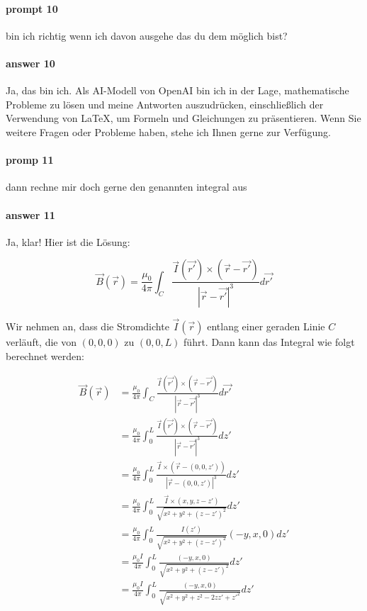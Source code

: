 \documentclass{article}
\begin{document}
\paragraph{prompt 10} %
\label{par:prompt 10}
bin ich richtig wenn ich davon ausgehe das du dem möglich bist?

\paragraph{answer 10} %
\label{par:answer 10}
Ja, das bin ich. Als AI-Modell von OpenAI bin ich in der Lage, mathematische
Probleme zu lösen und meine Antworten auszudrücken, einschließlich der
Verwendung von LaTeX, um Formeln und Gleichungen zu präsentieren. Wenn Sie
weitere Fragen oder Probleme haben, stehe ich Ihnen gerne zur Verfügung.

\paragraph{promp 11} %
\label{par:promp 11paragraph name}
dann rechne mir doch gerne den genannten integral aus

\paragraph{answer 11} %
\label{par:answer 11}
Ja, klar! Hier ist die Lösung:

$$\vec{B}(\vec{r}) = \frac{\mu_0}{4\pi} \int_{C} \frac{\vec{I}(\vec{r'}) \times (\vec{r} - \vec{r'})}{\left|\vec{r} - \vec{r'}\right|^3} d\vec{r'}$$

Wir nehmen an, dass die Stromdichte $\vec{I}(\vec{r})$ entlang einer geraden
Linie $C$ verläuft, die von $(0,0,0)$ zu $(0,0,L)$ führt. Dann kann das
Integral wie folgt berechnet werden:

\begin{align}
\vec{B}(\vec{r}) & = \frac{\mu_0}{4\pi} \int_{C} \frac{\vec{I}(\vec{r'}) \times (\vec{r} - \vec{r'})}{\left|\vec{r} - \vec{r'}\right|^3} d\vec{r'} \\
& = \frac{\mu_0}{4\pi} \int_0^L \frac{\vec{I}(\vec{r'}) \times (\vec{r} - \vec{r'})}{\left|\vec{r} - \vec{r'}\right|^3} dz' \\
& = \frac{\mu_0}{4\pi} \int_0^L \frac{\vec{I} \times (\vec{r} - (0,0,z'))}{\left|\vec{r} - (0,0,z')\right|^3} dz' \\
& = \frac{\mu_0}{4\pi} \int_0^L \frac{\vec{I} \times (x,y,z-z')}{\sqrt{x^2 + y^2 + (z-z')^2}} dz' \\
& = \frac{\mu_0}{4\pi} \int_0^L \frac{I(z')}{\sqrt{x^2 + y^2 + (z-z')^2}} (-y,x,0) dz' \\
& = \frac{\mu_0 I}{4\pi} \int_0^L \frac{(-y,x,0)}{\sqrt{x^2 + y^2 + (z-z')^2}} dz' \\
& = \frac{\mu_0 I}{4\pi} \int_0^L \frac{(-y,x,0)}{\sqrt{x^2 + y^2 + z^2 - 2zz' + z'^2}} dz'
\end{align}
\end{document}
